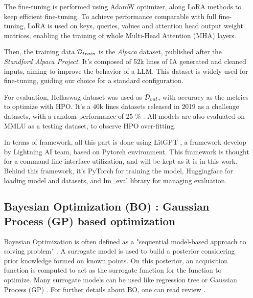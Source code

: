 \documentclass[runningheads]{llncs}
\begin{document}
The fine-tuning is performed using AdamW \cite{loshchilov_decoupled_2019} optimizer, along LoRA methods to keep efficient fine-tuning. To achieve performance comparable with full fine-tuning, LoRA is used on keys, queries, values and attention head output weight matrices, enabling the training of whole Multi-Head Attention (MHA) layers. 

Then, the training data $\mathcal{D}_{train}$ is the \textit{Alpaca} dataset, published after the \textit{Standford Alpaca Project}. It's composed of 52k lines of IA generated and cleaned inputs, aiming to improve the behavior of a LLM. This dataset is widely used \cite{dettmers_qlora_2023,chung_scaling_2024,zhou_lima_2023} for fine-tuning, guiding our choice for a standard configuration. 

For evaluation, Hellaswag \cite{zellers_hellaswag_2019} dataset was used as $\mathcal{D}_{val}$, with accuracy as the metrics to optimize with HPO. It's a 40k lines datasets released in 2019 as a challenge datasets, with a random performance of 25 \% . All models are also evaluated on MMLU \cite{hendryckstest2021} as a testing dataset, to observe HPO over-fitting. 

In terms of framework, all this part is done using LitGPT \cite{the_lightning_ai_team_litgpt_2023}, a framework develop by Lightning AI team, based on Pytorch  \cite{ansel_pytorch_2024} environment. This framework is thought for a command line interface utilization, and will be kept as it is in this work. Behind this framework, it's PyTorch for training the model, Huggingface for loading model and datasets, and lm\_eval library for managing evaluation.

\subsection{Bayesian Optimization (BO) : Gaussian Process (GP) based optimization}
\label{sec:bo}

Bayesian Optimization is often defined as a "sequential model-based approach to solving problem" \cite{shahriari_taking_2016}. A surrogate model is used to build a posterior considering prior knowledge formed on known points. On this posterior, an acquisition function is computed to act as the surrogate function for the function to optimize. Many surrogate models can be used like regression tree \cite{ammari_linear_2023} or Gaussian Process (GP) \cite{rajaram_empirical_2021}. For further details about BO, one can read review \cite{shahriari_taking_2016}.
\end{document}
